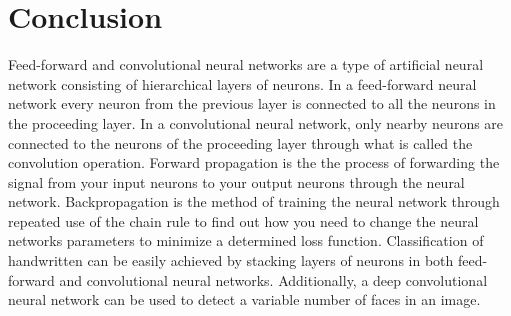 \documentclass[a4paper,11pt,twoside]{article}
\begin{document}
\section{Conclusion} 
Feed-forward and convolutional neural networks are a type of artificial neural network consisting of hierarchical layers of neurons. In a feed-forward neural network every neuron from the previous layer is connected to all the neurons in the proceeding layer. In a convolutional neural network, only nearby neurons are connected to the neurons of the proceeding layer through what is called the convolution operation. Forward propagation is the the process of forwarding the signal from your input neurons to your output neurons through the neural network. Backpropagation is the method of training the neural network through repeated use of the chain rule to find out how you need to change the neural networks parameters to minimize a determined loss function. Classification of handwritten can be easily achieved by stacking layers of neurons in both feed-forward and convolutional neural networks. Additionally, a deep convolutional neural network can be used to detect a variable number of faces in an image.
\end{document}
